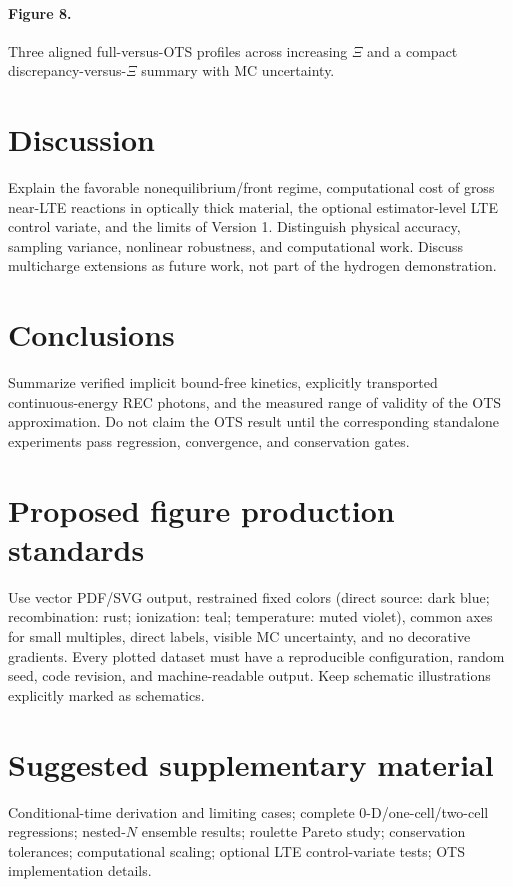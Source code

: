\documentclass[11pt]{article}
\begin{document}
\paragraph{Figure 8.} Three aligned full-versus-OTS profiles across increasing $\Xi$ and a compact discrepancy-versus-$\Xi$ summary with MC uncertainty.
\section{Discussion}
Explain the favorable nonequilibrium/front regime, computational cost of gross near-LTE reactions in optically thick material, the optional estimator-level LTE control variate, and the limits of Version 1. Distinguish physical accuracy, sampling variance, nonlinear robustness, and computational work. Discuss multicharge extensions as future work, not part of the hydrogen demonstration.
\section{Conclusions}
Summarize verified implicit bound-free kinetics, explicitly transported continuous-energy REC photons, and the measured range of validity of the OTS approximation. Do not claim the OTS result until the corresponding standalone experiments pass regression, convergence, and conservation gates.
\appendix
\section{Proposed figure production standards}
Use vector PDF/SVG output, restrained fixed colors (direct source: dark blue; recombination: rust; ionization: teal; temperature: muted violet), common axes for small multiples, direct labels, visible MC uncertainty, and no decorative gradients. Every plotted dataset must have a reproducible configuration, random seed, code revision, and machine-readable output. Keep schematic illustrations explicitly marked as schematics.
\section{Suggested supplementary material}
Conditional-time derivation and limiting cases; complete 0-D/one-cell/two-cell regressions; nested-$N$ ensemble results; roulette Pareto study; conservation tolerances; computational scaling; optional LTE control-variate tests; OTS implementation details.
\end{document}
